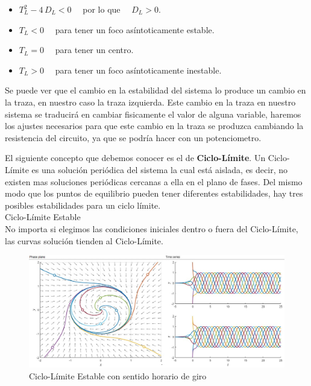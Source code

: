 \documentclass[12pt,a4paper]{report} %
\begin{document}
		\begin{itemize}
			\item $T_L^2-4\,D_L<0\quad$ por lo que $\quad D_L>0$.
			\item $T_L<0\quad$ para tener un foco asíntoticamente estable.
			\item $T_L=0\quad$ para tener un centro.
			\item $T_L>0\quad$ para tener un foco asíntoticamente inestable.
		\end{itemize}\smallskip
		
		\vspace{0.5cm}Se puede ver que el cambio en la estabilidad del sistema lo produce un cambio en la traza, en nuestro caso la traza izquierda. Este cambio en la traza en nuestro sistema se traducirá en cambiar fisicamente el valor  de alguna variable, haremos los ajustes necesarios para que este cambio en la traza se produzca cambiando la resistencia del circuito, ya que se podría hacer con un potenciometro.
		
		\vspace{0.5cm}El siguiente concepto que debemos conocer es el de \textbf{Ciclo-Límite}. Un Ciclo-Límite es una solución periódica del sistema la cual está aislada, es decir, no existen mas soluciones periódicas cercanas a ella en el plano de fases. Del mismo modo que los puntos de equilibrio pueden tener diferentes estabilidades, hay tres posibles estabilidades para un ciclo límite.\\[0.5cm]
		
		{\Large\textbullet\quad Ciclo-Límite Estable}\\[0.5cm]
		
		No importa si elegimos las condiciones iniciales dentro o fuera del Ciclo-Límite, las curvas solución tienden al Ciclo-Límite.
		
		\begin{figure}[h]
			\centering
			\includegraphics[width=1\textwidth]{cle.jpg}
			\caption{Ciclo-Límite Estable con sentido horario de giro}
			\label{fig:cle}
		\end{figure}\smallskip
\end{document}
